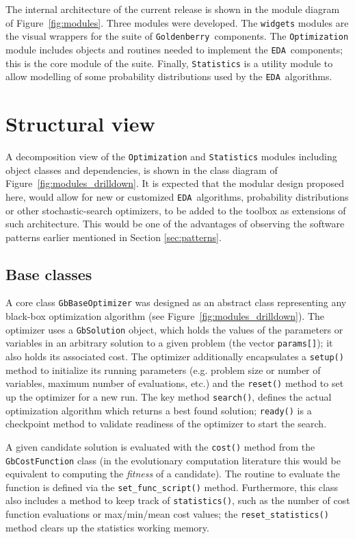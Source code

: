 \documentclass{sig-alternate}
\newcommand{\GB}{\texttt{Goldenberry}}
\newcommand{\EDA}{\texttt{EDA}}
\newcommand{\figref}[1]{\mbox{Figure \ref{#1}}}
\begin{document}
The internal architecture of the current release is shown in the module diagram of \figref{fig:modules}. Three modules were developed. The \texttt{widgets} modules are the visual wrappers for the suite of \GB~components. The \texttt{Optimization} module includes objects and routines needed to implement the \EDA~components; this is the core module of the suite. Finally, \texttt{Statistics} is a utility module to allow modelling of some probability distributions used by the \EDA~algorithms.

\section{Structural view}
A decomposition view of the \texttt{Optimization} and \texttt{Statistics} modules including object classes and dependencies, is shown in the class diagram of \figref{fig:modules_drilldown}. It is expected that the modular design proposed here, would allow for new or customized \EDA~algorithms, probability distributions or other stochastic-search optimizers, to be added to the toolbox as extensions of such architecture. This would be one of the advantages of observing the software patterns earlier mentioned in Section \ref{sec:patterns}.

\subsection{Base classes}
A core class \texttt{GbBaseOptimizer} was designed as an abstract class representing any black-box optimization algorithm (see \figref{fig:modules_drilldown}). The optimizer uses a \texttt{GbSolution} object, which holds the values of the parameters or variables in an arbitrary solution to a given problem (the vector \texttt{params[]}); it also holds its associated cost. The optimizer additionally encapsulates a \texttt{setup()} method to initialize its running parameters (e.g. problem size or number of variables, maximum number of evaluations, etc.) and the \texttt{reset()} method to set up the optimizer for a new run. The key method \texttt{search()}, defines the actual optimization algorithm which returns a best found solution; \texttt{ready()} is a checkpoint method to validate readiness of the optimizer to start the search.

A given candidate solution is evaluated with the \texttt{cost()} method from the \texttt{GbCostFunction} class (in the evolutionary computation literature this would be equivalent to computing the \emph{fitness} of a candidate). The routine to evaluate the function is defined via the \texttt{set\_func\_script()} method. Furthermore, this class also includes a method to keep track of \texttt{statistics()}, such as the number of cost function evaluations or max/min/mean cost values; the {\texttt{reset\_statistics()}} method clears up the statistics working memory.\\
\end{document}
